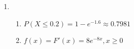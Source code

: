 \documentclass[12pt, a4paper]{article}
\begin{document}
\begin{enumerate}[Q\arabic*.]
  \item 
    \begin{enumerate}[(\roman*)]
      \item $P(X\leq 0.2) = 1-e^{-1.6}\approx 0.7981$

      \item $f(x) = F'(x) = 8e^{-8x}, x\geq 0$
    \end{enumerate}
\end{enumerate}
\end{document}
